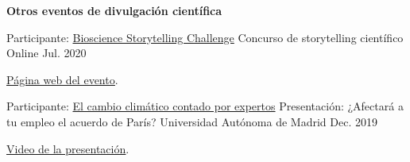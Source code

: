 \textbf{Otros eventos de divulgación científica}
\begin{cventries}
  \cventry
    {Participante:  \href{https://microbiosdigital.com/20/08/03/bioscience-storytelling-challenge/}{Bioscience Storytelling Challenge}} %
    {Concurso de storytelling científico} %
    {Online} %
    {Jul. 2020} %
    {
    \begin{cvitems} %
        \item {\underline{\href{https://microbiosdigital.com/2020/08/03/bioscience-storytelling-challenge/}{Página web del evento}}.}        	
    \end{cvitems}
    }
    
  \cventry
    {Participante:  \href{https://workshops.ift.uam-csic.es/cambioclimatico/Programa}{El cambio climático contado por expertos}} %
    {Presentación: ¿Afectará a tu empleo el acuerdo de París?} %
    {Universidad Autónoma de Madrid} %
    {Dec. 2019} %
    {
    \begin{cvitems} %
        \item {\underline{\href{https://m.youtube.com/watch?v=rB3-6bywW_Q}{Video de la presentación}}.}        	\end{cvitems}
    }
\end{cventries}